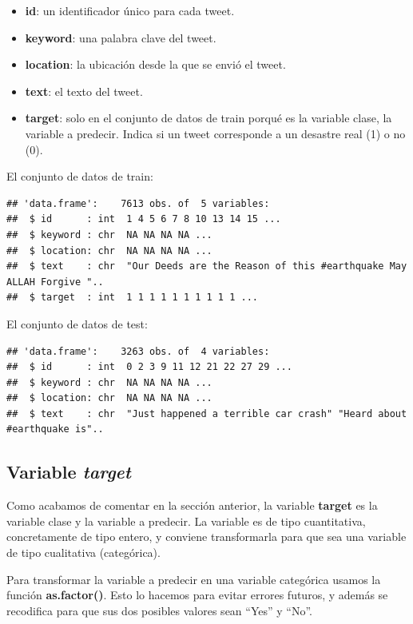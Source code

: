 \documentclass[]{article}
\providecommand{\tightlist}{%
  \setlength{\itemsep}{0pt}\setlength{\parskip}{0pt}}
\begin{document}
\begin{itemize}
\tightlist
\item
  \textbf{id}: un identificador único para cada tweet.
\item
  \textbf{keyword}: una palabra clave del tweet.
\item
  \textbf{location}: la ubicación desde la que se envió el tweet.
\item
  \textbf{text}: el texto del tweet.
\item
  \textbf{target}: solo en el conjunto de datos de train porqué es la
  variable clase, la variable a predecir. Indica si un tweet corresponde a un
  desastre real (1) o no (0).
\end{itemize}

El conjunto de datos de train:

\begin{verbatim}
## 'data.frame':    7613 obs. of  5 variables:
##  $ id      : int  1 4 5 6 7 8 10 13 14 15 ...
##  $ keyword : chr  NA NA NA NA ...
##  $ location: chr  NA NA NA NA ...
##  $ text    : chr  "Our Deeds are the Reason of this #earthquake May ALLAH Forgive "..
##  $ target  : int  1 1 1 1 1 1 1 1 1 1 ...
\end{verbatim}

El conjunto de datos de test:

\begin{verbatim}
## 'data.frame':    3263 obs. of  4 variables:
##  $ id      : int  0 2 3 9 11 12 21 22 27 29 ...
##  $ keyword : chr  NA NA NA NA ...
##  $ location: chr  NA NA NA NA ...
##  $ text    : chr  "Just happened a terrible car crash" "Heard about #earthquake is"..
\end{verbatim}

\hypertarget{variable-target}{%
\subsection{\texorpdfstring{Variable
\emph{target}}{Variable target}}\label{variable-target}}

Como acabamos de comentar en la sección anterior, la variable \textbf{target} es la variable clase y la variable a
predecir. La variable es de tipo cuantitativa, concretamente de tipo entero, y conviene
transformarla para que sea una variable de tipo cualitativa (categórica). 

Para transformar la variable a predecir en una variable categórica usamos la función \textbf{as.factor()}. Esto lo hacemos para evitar errores futuros, y además se recodifica para que sus dos posibles valores sean ``Yes'' y ``No''.
\end{document}

